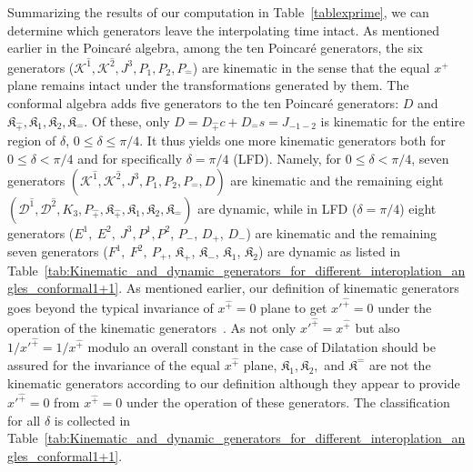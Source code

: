 \documentclass[foundations,article,submit,pdftex,moreauthors]{Definitions/mdpi}
\newcommand{\pT}{\hat{+}}
\newcommand{\mT}{\hat{-}}
\newcommand{\itP}[1]{\hat{#1}}
\begin{document}
Summarizing the results of our computation in Table~\ref{tablexprime}, we can determine which generators leave the interpolating time intact.
As mentioned earlier in the Poincar\'e algebra, among the ten Poincar\'e generators, the six generators ($\mathcal{K}^{\itP{1}}, \mathcal{K}^{\itP{2}}, J^{3}, P_{1}, P_{2}, P_{\mT}$) are kinematic in the sense that the
{ equal $x^{\pT}$} plane remains intact under the transformations generated by them.
{The conformal algebra adds five generators to the ten Poincar\'e generators: $D$ and $\mathfrak{K}_{\hat+},\mathfrak{K}_{1},\mathfrak{K}_{2},\mathfrak{K}_{\hat-}$. Of these, only $D=D_{\hat+}c+D_{\hat-}s=J_{-1-2}$ is kinematic for {\color{blue} the entire region of $\delta$, $0\le\delta\le\pi/4$. 
It thus yields one more kinematic generators 
both for $0\le\delta<\pi/4$ and for specifically $\delta=\pi/4$ (LFD).  
Namely, for $0\le\delta<\pi/4$, seven generators $(\mathcal{K}^{\hat1},\mathcal{K}^{\hat2},J^{3},P_{1},P_{2},P_{\hat-},D)$ are kinematic and the remaining eight $(\mathcal{D}^{\hat1},\mathcal{D}^{\hat2},K_3,P_{\hat+},\mathfrak{K}_{\hat+},\mathfrak{K}_{1},\mathfrak{K}_{2},\mathfrak{K}_{\hat-})$ are dynamic, while in LFD ($\delta=\pi/4$) 
eight generators ($E^{1},~ E^{2},~ J^{3}, P^{1}, P^{2}$, $P_{-}$, $D_{+}$, $D_{-}$) are kinematic and the remaining seven generators ($F^{1},~ F^{2},~ P_{+}$, $\mathfrak{K}_{{+}}$, $\mathfrak{K}_{{-}}$, $\mathfrak{K}_{{1}}$, $\mathfrak{K}_{{2}}$) are dynamic as listed in Table~\ref{tab:Kinematic_and_dynamic_generators_for_different_interoplation_angles_conformal1+1}. 
As mentioned earlier, our definition of kinematic generators goes beyond the typical invariance of $x^{\hat +} =0$ plane to get $x'^{\hat +} =0$ under the operation of the kinematic generators~\cite{LEUTWYLER197894}. As not only $x'^{\hat +} = x^{\hat +}$ but also $1/x'^{\hat +} = 1/x^{\hat +}$ modulo an overall constant in the case of Dilatation should be assured for the invariance of the equal $x^{\hat +}$ plane,  $\mathfrak{K}_1, \mathfrak{K}_2,$ and $\mathfrak{K}^{\hat{-}}$ are not the kinematic generators according to our definition although they appear to provide $x'^{\hat +} =0$ from $x^{\hat +} =0$ under the operation of these generators. 
} The classification for all $\delta$ is collected in Table~\ref{tab:Kinematic_and_dynamic_generators_for_different_interoplation_angles_conformal1+1}.}
\end{document}

